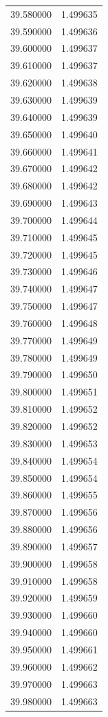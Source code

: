 \begin{tabular}{rr}
39.580000 & 1.499635 \\
39.590000 & 1.499636 \\
39.600000 & 1.499637 \\
39.610000 & 1.499637 \\
39.620000 & 1.499638 \\
39.630000 & 1.499639 \\
39.640000 & 1.499639 \\
39.650000 & 1.499640 \\
39.660000 & 1.499641 \\
39.670000 & 1.499642 \\
39.680000 & 1.499642 \\
39.690000 & 1.499643 \\
39.700000 & 1.499644 \\
39.710000 & 1.499645 \\
39.720000 & 1.499645 \\
39.730000 & 1.499646 \\
39.740000 & 1.499647 \\
39.750000 & 1.499647 \\
39.760000 & 1.499648 \\
39.770000 & 1.499649 \\
39.780000 & 1.499649 \\
39.790000 & 1.499650 \\
39.800000 & 1.499651 \\
39.810000 & 1.499652 \\
39.820000 & 1.499652 \\
39.830000 & 1.499653 \\
39.840000 & 1.499654 \\
39.850000 & 1.499654 \\
39.860000 & 1.499655 \\
39.870000 & 1.499656 \\
39.880000 & 1.499656 \\
39.890000 & 1.499657 \\
39.900000 & 1.499658 \\
39.910000 & 1.499658 \\
39.920000 & 1.499659 \\
39.930000 & 1.499660 \\
39.940000 & 1.499660 \\
39.950000 & 1.499661 \\
39.960000 & 1.499662 \\
39.970000 & 1.499663 \\
39.980000 & 1.499663 \\

\end{tabular}
